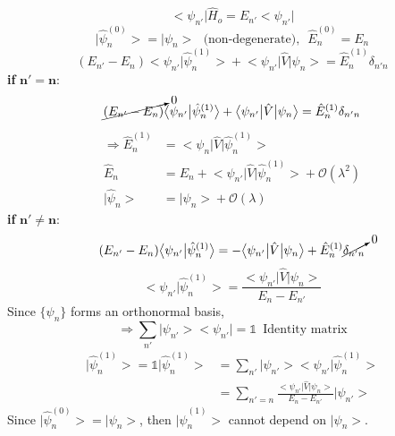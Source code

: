 \documentclass[12pt,fancychapters]{report}
\numberwithin{equation}{section}
\begin{document}
\begin{equation*}
	\big<\psi_{n'} \big|\hat{H}_o = E_{n'} \big<\psi_{n'} \big|
\end{equation*}
$$
\big|\hat{\psi}^{(0)}_n \big> = \big|\psi_n \big>\,\,\,\,\text{(non-degenerate)},\,\,\,\hat{E}^{(0)}_n = E_n
$$
\begin{equation*}
	(E_{n'}-E_n)\big< \psi_{n'} \big|\hat{\psi}^{(1)}_n \big> + \big < \psi_{n'} \big| \hat{V}\big|\psi_n \big>
	= \hat{E}^{(1)}_n \delta_{n'n}
\end{equation*}
\textbf{if} $\mathbf{n'= n}$:
\begin{equation*}
	\cancelto{0}{(E_{n'}-E_n)} \big< \psi_{n'} \big|\hat{\psi}^{(1)}_n \big> + \big < \psi_{n'} \big| \hat{V}\big|\psi_n \big>
	= \hat{E}^{(1)}_n \delta_{n'n}
\end{equation*}
\begin{align*}
	\Longrightarrow \hat{E}^{(1)}_n & = \big < \psi_{n} \big| \hat{V}\big|\hat{\psi}^{(1)}_n \big>\\
	\hat{E}_n & = E_n + \big < \psi_{n'} \big| \hat{V}\big|\hat{\psi}^{(1)}_n \big> + \mathcal{O}(\lambda^2)\\
	\big | \hat{\psi}_n \big > & = \big| \psi_n \big> + \mathcal{O} (\lambda)
\end{align*}
\textbf{if} $\mathbf{n'\neq n}$:
\begin{equation*}
	(E_{n'}-E_n)\big< \psi_{n'} \big|\hat{\psi}^{(1)}_n \big> = -\big < \psi_{n'} \big| \hat{V}\big|\psi_n \big>
	+ \hat{E}^{(1)}_n \cancelto{0}{\delta_{n'n}}
\end{equation*}
\begin{equation*}
	\big< \psi_{n'} \big|\hat{\psi}^{(1)}_n \big> = \frac{\big < \psi_{n'} \big| \hat{V}\big|\psi_n \big>}{E_n - E_{n'}}
\end{equation*}
Since $\{ \psi_n\}$ forms an orthonormal basis,
\begin{equation*}
	\Longrightarrow \sum_{n'} \big|\psi_{n'} \big> \big< \psi_{n'} \big | = \mathbb{1}\,\,\,\text{Identity matrix}
\end{equation*}
\begin{align*}
	\big| \hat{\psi}^{(1)}_n \big > = \mathbb{1} \big|\hat{\psi}^{(1)}_n\big> & = \sum_{n'} \big|\psi_{n'}
	\big> \big < \psi_{n'} | \hat{\psi}^{(1)}_n \big>\\
	& = \sum_{n'=n} \frac{\big < \psi_{n'} \big| \hat{V}\big|\psi_n \big>}{E_n- E_{n'}} \big|\psi_{n'} \big> 
\end{align*}
Since $\big |\hat{\psi}^{(0)}_n \big> = \big| \psi_{n} \big>$, then $\big |\hat{\psi}^{(1)}_n \big>$
cannot depend on $\big|\psi_n\big>$. 
\newpage
\end{document}
